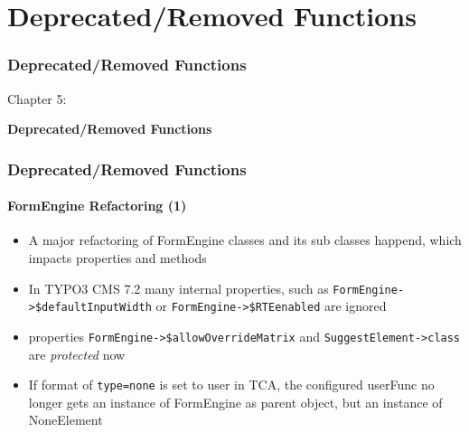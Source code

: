%

\section{Deprecated/Removed Functions}
\begin{frame}[fragile]
	\frametitle{Deprecated/Removed Functions}

	\begin{center}\huge{Chapter 5:}\end{center}
	\begin{center}\huge{\color{typo3darkgrey}\textbf{Deprecated/Removed Functions}}\end{center}

\end{frame}


\begin{frame}[fragile]
	\frametitle{Deprecated/Removed Functions}
	\framesubtitle{FormEngine Refactoring (1)}

	\begin{itemize}

		\item A major refactoring of FormEngine classes and its sub classes
			happend, which impacts properties and methods

		\item In TYPO3 CMS 7.2 many internal properties, such as
			\small\texttt{FormEngine->\$defaultInputWidth}\normalsize\space
			or
			\small\texttt{FormEngine->\$RTEenabled}\normalsize\space\newline
			are ignored

		\item properties
			\small\texttt{FormEngine->\$allowOverrideMatrix}\normalsize\space
			and
			\small\texttt{SuggestElement->class}\normalsize\space
			are \textit{protected} now

		\item If format of \texttt{type=none} is set to user in TCA, the configured
			userFunc no longer gets an instance of FormEngine as parent object,
			but an instance of NoneElement

	\end{itemize}

\end{frame}


